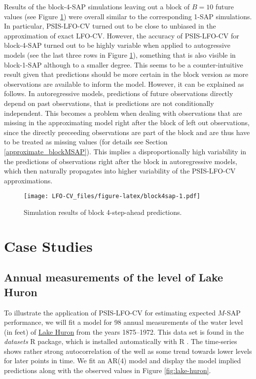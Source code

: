 \documentclass[american,]{article}
\begin{document}
Results of the block-4-SAP simulations leaving out a block of \(B = 10\) future
values (see Figure \ref{fig:block4sap}) were overall similar to the
corresponding 1-SAP simulations. In particular, PSIS-LFO-CV turned out to be
close to unbiased in the approximation of exact LFO-CV. However, the accuracy of
PSIS-LFO-CV for block-4-SAP turned out to be highly variable when applied to
autogressive models (see the last three rows in Figure \ref{fig:block4sap}),
something that is also visible in block-1-SAP although to a smaller degree. This
seems to be a counter-intuitive result given that predictions should be more
certain in the block version as more observations are available to inform the
model. However, it can be explained as follows. In autoregressive models,
predictions of future observations directly depend on past observations, that is
predictions are not conditionally independent. This becomes a problem when
dealing with observations that are missing in the approximating model right
after the block of left out observations, since the directly preceeding
observations are part of the block and are thus have to be treated as missing
values (for details see Section \ref{approximate_blockMSAP}). This implies a
disproportionally high variability in the predictions of observations right
after the block in autoregressive models, which then naturally propagates into
higher variability of the PSIS-LFO-CV approximations.

\begin{figure}
\centering
\texttt{[image: LFO-CV\_files/figure-latex/block4sap-1.pdf]}
\caption{\label{fig:block4sap}Simulation results of block 4-step-ahead predictions.}
\end{figure}

\hypertarget{case-studies}{%
\section{Case Studies}\label{case-studies}}

\hypertarget{annual-measurements-of-the-level-of-lake-huron}{%
\subsection{Annual measurements of the level of Lake Huron}\label{annual-measurements-of-the-level-of-lake-huron}}

To illustrate the application of PSIS-LFO-CV for estimating expected \(M\)-SAP
performance, we will fit a model for 98 annual measurements of the water level
(in feet) of \href{https://en.wikipedia.org/wiki/Lake_Huron}{Lake Huron} from the
years 1875--1972. This data set is found in the \emph{datasets} R package, which is
installed automatically with R \citep{R2018}. The time-series shows rather strong
autocorrelation of the well as some trend towards lower levels for later points
in time. We fit an AR(4) model and display the model implied predictions along
with the observed values in Figure \ref{fig:lake-huron}.
\end{document}
